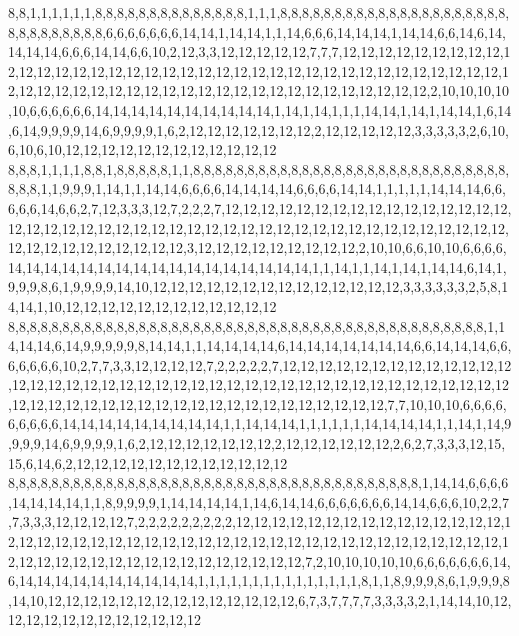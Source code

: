 8,8,1,1,1,1,1,1,8,8,8,8,8,8,8,8,8,8,8,8,8,8,1,1,1,8,8,8,8,8,8,8,8,8,8,8,8,8,8,8,8,8,8,8,8,8,8,8,8,8,8,8,8,8,8,6,6,6,6,6,6,6,14,14,1,14,14,1,1,14,6,6,6,14,14,14,1,14,14,6,6,14,6,14,14,14,14,6,6,6,14,14,6,6,10,2,12,3,3,12,12,12,12,12,7,7,7,12,12,12,12,12,12,12,12,12,12,12,12,12,12,12,12,12,12,12,12,12,12,12,12,12,12,12,12,12,12,12,12,12,12,12,12,12,12,12,12,12,12,12,12,12,12,12,12,12,12,12,12,12,12,12,12,12,12,12,12,12,2,10,10,10,10,10,6,6,6,6,6,6,14,14,14,14,14,14,14,14,14,14,1,14,1,14,1,1,1,14,14,1,14,1,14,14,1,6,14,6,14,9,9,9,9,14,6,9,9,9,9,1,6,2,12,12,12,12,12,12,12,2,12,12,12,12,12,3,3,3,3,3,2,6,10,6,10,6,10,12,12,12,12,12,12,12,12,12,12,12,12
8,8,8,1,1,1,1,8,8,1,8,8,8,8,8,1,1,8,8,8,8,8,8,8,8,8,8,8,8,8,8,8,8,8,8,8,8,8,8,8,8,8,8,8,8,8,8,8,8,1,1,9,9,9,1,14,1,1,14,14,6,6,6,6,14,14,14,14,6,6,6,6,14,14,1,1,1,1,1,14,14,14,6,6,6,6,6,14,6,6,2,7,12,3,3,3,12,7,2,2,2,7,12,12,12,12,12,12,12,12,12,12,12,12,12,12,12,12,12,12,12,12,12,12,12,12,12,12,12,12,12,12,12,12,12,12,12,12,12,12,12,12,12,12,12,12,12,12,12,12,12,12,12,12,12,12,3,12,12,12,12,12,12,12,12,12,2,10,10,6,6,10,10,6,6,6,6,14,14,14,14,14,14,14,14,14,14,14,14,14,14,14,14,14,1,1,14,1,1,14,1,14,1,14,14,6,14,1,9,9,9,8,6,1,9,9,9,9,14,10,12,12,12,12,12,12,12,12,12,12,12,12,12,12,3,3,3,3,3,3,2,5,8,14,14,1,10,12,12,12,12,12,12,12,12,12,12,12,12
8,8,8,8,8,8,8,8,8,8,8,8,8,8,8,8,8,8,8,8,8,8,8,8,8,8,8,8,8,8,8,8,8,8,8,8,8,8,8,8,8,8,8,8,1,14,14,14,6,14,9,9,9,9,9,8,14,14,1,1,14,14,14,14,6,14,14,14,14,14,14,14,6,6,14,14,14,6,6,6,6,6,6,6,10,2,7,7,3,3,12,12,12,12,7,2,2,2,2,2,7,12,12,12,12,12,12,12,12,12,12,12,12,12,12,12,12,12,12,12,12,12,12,12,12,12,12,12,12,12,12,12,12,12,12,12,12,12,12,12,12,12,12,12,12,12,12,12,12,12,12,12,12,12,12,12,12,12,12,12,12,12,12,7,7,10,10,10,6,6,6,6,6,6,6,6,6,14,14,14,14,14,14,14,14,14,1,1,14,14,14,1,1,1,1,1,1,14,14,14,14,1,1,14,1,14,9,9,9,9,14,6,9,9,9,9,1,6,2,12,12,12,12,12,12,12,2,12,12,12,12,12,12,2,6,2,7,3,3,3,12,15,15,6,14,6,2,12,12,12,12,12,12,12,12,12,12,12,12
8,8,8,8,8,8,8,8,8,8,8,8,8,8,8,8,8,8,8,8,8,8,8,8,8,8,8,8,8,8,8,8,8,8,8,8,8,8,1,14,14,6,6,6,6,14,14,14,14,1,1,8,9,9,9,9,1,14,14,14,14,1,14,6,14,14,6,6,6,6,6,6,6,14,14,6,6,6,10,2,2,7,7,3,3,3,12,12,12,12,7,2,2,2,2,2,2,2,2,2,12,12,12,12,12,12,12,12,12,12,12,12,12,12,12,12,12,12,12,12,12,12,12,12,12,12,12,12,12,12,12,12,12,12,12,12,12,12,12,12,12,12,12,12,12,12,12,12,12,12,12,12,12,12,12,12,12,12,12,12,7,2,10,10,10,10,10,6,6,6,6,6,6,6,14,6,14,14,14,14,14,14,14,14,14,14,1,1,1,1,1,1,1,1,1,1,1,1,1,1,1,8,1,1,8,9,9,9,8,6,1,9,9,9,8,14,10,12,12,12,12,12,12,12,12,12,12,12,12,12,12,6,7,3,7,7,7,7,3,3,3,3,2,1,14,14,10,12,12,12,12,12,12,12,12,12,12,12,12
